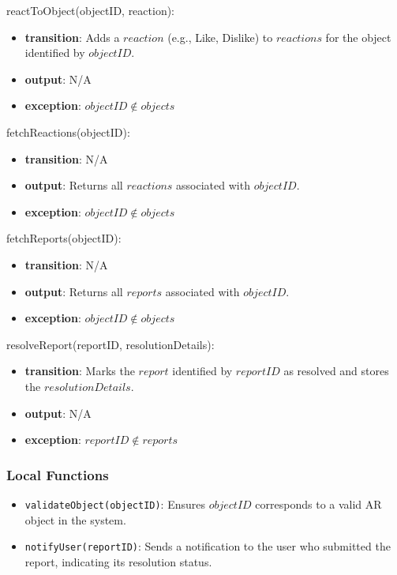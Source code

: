 \documentclass[12pt, titlepage]{article}
\begin{document}
\noindent reactToObject(objectID, reaction):
\begin{itemize}
  \item \textbf{transition}:
        Adds a \( reaction \) (e.g., Like, Dislike) to \( reactions \) for the object identified by \( objectID \).
  \item \textbf{output}: N/A
  \item \textbf{exception}: \( objectID \notin objects \)
\end{itemize}

\noindent fetchReactions(objectID):
\begin{itemize}
  \item \textbf{transition}: N/A
  \item \textbf{output}: Returns all \( reactions \) associated with \( objectID \).
  \item \textbf{exception}: \( objectID \notin objects \)
\end{itemize}

\noindent fetchReports(objectID):
\begin{itemize}
  \item \textbf{transition}: N/A
  \item \textbf{output}: Returns all \( reports \) associated with \( objectID \).
  \item \textbf{exception}: \( objectID \notin objects \)
\end{itemize}

\noindent resolveReport(reportID, resolutionDetails):
\begin{itemize}
  \item \textbf{transition}:
        Marks the \( report \) identified by \( reportID \) as resolved and stores the \( resolutionDetails \).
  \item \textbf{output}: N/A
  \item \textbf{exception}: \( reportID \notin reports \)
\end{itemize}

\subsubsection{Local Functions}

\begin{itemize}
  \item \texttt{validateObject(objectID)}: Ensures \( objectID \) corresponds to a valid AR object in the system.
  \item \texttt{notifyUser(reportID)}: Sends a notification to the user who submitted the report, indicating its resolution status.
\end{itemize}
\end{document}
